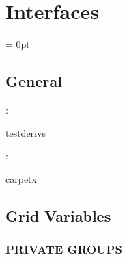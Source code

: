 
\section{Interfaces} 


\parskip = 0pt

\vspace{3mm} \subsection*{General}

: 

testderivs
\vspace{2mm}

: 

carpetx
\vspace{2mm}
\subsection*{Grid Variables}
\vspace{5mm}\subsubsection{PRIVATE GROUPS}

\vspace{5mm}

